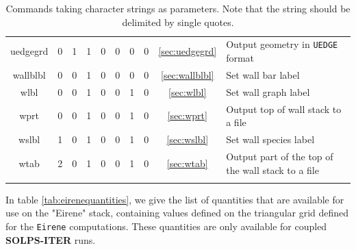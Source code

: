 \documentclass[a4paper,10pt]{report}
\newcommand\SOLPSITER{{\bf SOLPS-ITER} }
\begin{document}
\begin{center}
\begin{longtable}{|c|c|c|c|c|c|c|c|c|l|}
    uedgegrd \index{b2plot, uedgegrd} & 0 & 1 & 1 & 0 & 0 & 0 & 0 & \ref{sec:uedgegrd} & Output geometry in {\tt UEDGE} format \\
    wallblbl \index{b2plot, wallblbl} & 0 & 0 & 1 & 0 & 0 & 0 & 0 & \ref{sec:wallblbl} & Set wall bar label \\
    wlbl \index{b2plot, wlbl}    & 0 & 0 & 1 & 0 & 0 & 1 & 0 & \ref{sec:wlbl}     & Set wall graph label \\
    wprt \index{b2plot, wprt}    & 0 & 0 & 1 & 0 & 0 & 1 & 0 & \ref{sec:wprt}     & Output top of wall stack to a file \\
    wslbl \index{b2plot, wslbl}  & 1 & 0 & 1 & 0 & 0 & 1 & 0 & \ref{sec:wslbl}    & Set wall species label \\
    wtab \index{b2plot, wtab}    & 2 & 0 & 1 & 0 & 0 & 1 & 0 & \ref{sec:wtab}     & Output part of the top of the wall stack to a file \\
    \hline
    \caption{Commands taking character strings as parameters.  Note
      that the string should be delimited by single quotes.}
    \label{tab:character-variables}
  \end{longtable}
\end{center}

In table \ref{tab:eirenequantities}, we give the list of quantities that
are available for use on the "Eirene" stack, containing values defined
on the triangular grid defined for the {\tt Eirene} computations. These
quantities are only available for coupled \SOLPSITER runs.
\end{document}
